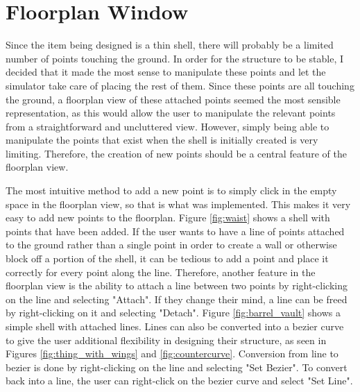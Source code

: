 \documentclass{thesis}
\begin{document}
\section{Floorplan Window}
Since the item being designed is a thin shell, there will probably be a limited number of points touching the ground.  In order
for the structure to be stable, I decided that it made the most sense to manipulate these points and let the simulator take care
of placing the rest of them.  Since these points are all touching the ground, a floorplan view of these attached points seemed the
most sensible representation, as this would allow the user to manipulate the relevant points from a straightforward and uncluttered view.
However, simply being able to manipulate the points that exist when the shell is initially created is very limiting.  Therefore,
the creation of new points should be a central feature of the floorplan view.

The most intuitive method to add a new point is to simply click in the empty space in the floorplan view, so that is what was
implemented.  This makes it very easy to add new points to the floorplan.  Figure \ref{fig:waist} shows a shell with points that
have been added.  If the user wants to have a line of points attached to the ground rather than a single point in order to create
a wall or otherwise block off a portion of the shell, it can be tedious to add a point and place it correctly for every point along
the line.  Therefore, another feature in the floorplan view is the ability to attach a line between two points by right-clicking on
the line and selecting "Attach".  If they change their mind, a line can be freed by right-clicking on it and selecting "Detach".
Figure \ref{fig:barrel_vault} shows a simple shell with attached lines.  Lines can also be converted into a bezier curve to give
the user additional flexibility in designing their structure, as seen in Figures \ref{fig:thing_with_wings} and
\ref{fig:countercurve}.  Conversion from line to bezier is done by right-clicking on the line and selecting "Set Bezier".  To
convert back into a line, the user can right-click on the bezier curve and select "Set Line".
\end{document}
